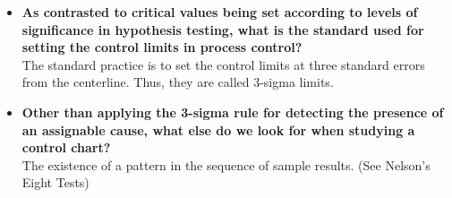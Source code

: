 \documentclass[12pt]{article}
\begin{document}
\begin{itemize}
\item \textbf{As contrasted to critical values being set according to levels of significance in hypothesis testing, what is
the standard used for setting the control limits in process control?}\\
The standard practice is to set the control limits at three standard errors from the centerline. Thus, they are
called 3-sigma limits.


\item \textbf{Other than applying the 3-sigma rule for detecting the presence of an assignable cause, what else do we look for
when studying a control chart?} \\
The existence of a pattern in the sequence of sample results. (See Nelson's Eight Tests)
\end{itemize}
\end{document}
